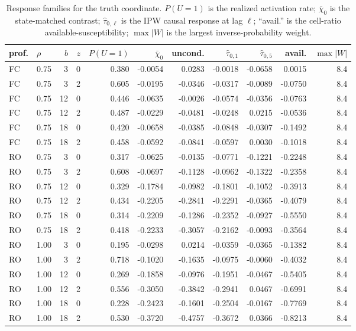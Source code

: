 \documentclass[11pt]{article}
\begin{document}
\begin{table}[htbp]\centering\small
\caption{Response families for the truth coordinate. $P(U{=}1)$ is the realized activation
rate; $\bar\chi_0$ is the state-matched contrast; $\hat\tau_{0,\ell}$ is the IPW causal
response at lag $\ell$; ``avail.'' is the cell-ratio available-susceptibility;
$\max|W|$ is the largest inverse-probability weight.}\label{tab:sus}
\begin{adjustbox}{max width=\textwidth}
\begin{tabular}{llrr rrr rr rr}
\toprule
prof. & $\rho$ & $b$ & $z$ & $P(U{=}1)$ & $\bar\chi_0$ & uncond. & $\hat\tau_{0,1}$ & $\hat\tau_{0,5}$ & avail. & $\max|W|$ \\
\midrule
FC & 0.75 & 3 & 0 & 0.380 & -0.0054 & 0.0283 & -0.0018 & -0.0658 & 0.0015 & 8.4 \\
FC & 0.75 & 3 & 2 & 0.605 & -0.0195 & -0.0346 & -0.0317 & -0.0089 & -0.0750 & 8.4 \\
FC & 0.75 & 12 & 0 & 0.446 & -0.0635 & -0.0026 & -0.0574 & -0.0356 & -0.0763 & 8.4 \\
FC & 0.75 & 12 & 2 & 0.487 & -0.0229 & -0.0481 & -0.0248 & 0.0215 & -0.0536 & 8.4 \\
FC & 0.75 & 18 & 0 & 0.420 & -0.0658 & -0.0385 & -0.0848 & -0.0307 & -0.1492 & 8.4 \\
FC & 0.75 & 18 & 2 & 0.458 & -0.0592 & -0.0841 & -0.0597 & 0.0030 & -0.1018 & 8.4 \\
RO & 0.75 & 3 & 0 & 0.317 & -0.0625 & -0.0135 & -0.0771 & -0.1221 & -0.2248 & 8.4 \\
RO & 0.75 & 3 & 2 & 0.608 & -0.0697 & -0.1128 & -0.0962 & -0.1322 & -0.2358 & 8.4 \\
RO & 0.75 & 12 & 0 & 0.329 & -0.1784 & -0.0982 & -0.1801 & -0.1052 & -0.3913 & 8.4 \\
RO & 0.75 & 12 & 2 & 0.434 & -0.2205 & -0.2841 & -0.2291 & -0.0365 & -0.4079 & 8.4 \\
RO & 0.75 & 18 & 0 & 0.314 & -0.2209 & -0.1286 & -0.2352 & -0.0927 & -0.5550 & 8.4 \\
RO & 0.75 & 18 & 2 & 0.418 & -0.2233 & -0.3057 & -0.2162 & -0.0093 & -0.3564 & 8.4 \\
RO & 1.00 & 3 & 0 & 0.195 & -0.0298 & 0.0214 & -0.0359 & -0.0365 & -0.1382 & 8.4 \\
RO & 1.00 & 3 & 2 & 0.718 & -0.1020 & -0.1635 & -0.0975 & -0.0060 & -0.4032 & 8.4 \\
RO & 1.00 & 12 & 0 & 0.269 & -0.1858 & -0.0976 & -0.1951 & -0.0467 & -0.5405 & 8.4 \\
RO & 1.00 & 12 & 2 & 0.556 & -0.3050 & -0.3842 & -0.2941 & 0.0467 & -0.6991 & 8.4 \\
RO & 1.00 & 18 & 0 & 0.228 & -0.2423 & -0.1601 & -0.2504 & -0.0167 & -0.7769 & 8.4 \\
RO & 1.00 & 18 & 2 & 0.530 & -0.3720 & -0.4757 & -0.3672 & 0.0366 & -0.8213 & 8.4 \\
\bottomrule
\end{tabular}
\end{adjustbox}
\end{table}
\end{document}
